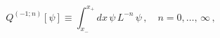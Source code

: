 \begin{equation*}
Q^{(-1;n)}[\psi] \equiv \int_{x_-}^{x_+}dx\,\psi\,L^{-n}\,\psi\,,\quad n=
0,\ldots,\,\infty\,,
\end{equation*}


